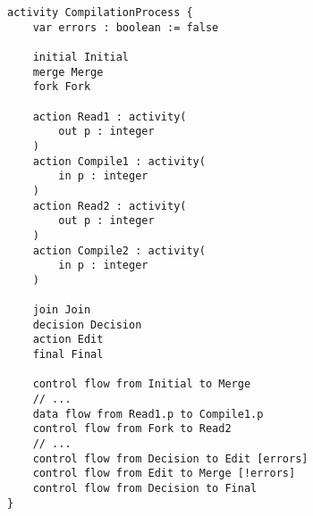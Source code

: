\begin{lstlisting}[float,language=activity, caption={Gamma Activity Language representation of the compilation activity.}, label={lst:gamma-activity}]
activity CompilationProcess {
	var errors : boolean := false
	
	initial Initial
	merge Merge
	fork Fork
	
	action Read1 : activity(
		out p : integer
	)
	action Compile1 : activity(
		in p : integer
	)
	action Read2 : activity(
		out p : integer
	)
	action Compile2 : activity(
		in p : integer
	)
	
	join Join
	decision Decision
	action Edit
	final Final
	
	control flow from Initial to Merge 
	// ...	
	data flow from Read1.p to Compile1.p
	control flow from Fork to Read2 
	// ...
	control flow from Decision to Edit [errors]
	control flow from Edit to Merge [!errors]
	control flow from Decision to Final
}	
\end{lstlisting}